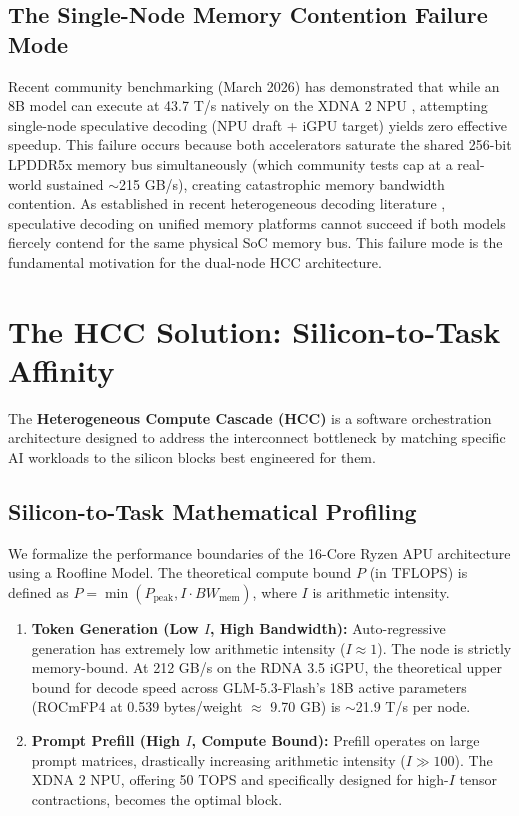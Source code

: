 \documentclass[11pt,a4paper]{article}
\begin{document}
\subsection{The Single-Node Memory Contention Failure Mode}

Recent community benchmarking (March 2026) has demonstrated that while an 8B model can execute at 43.7 T/s natively on the XDNA 2 NPU \cite{xdna_community}, attempting single-node speculative decoding (NPU draft + iGPU target) yields zero effective speedup. This failure occurs because both accelerators saturate the shared 256-bit LPDDR5x memory bus simultaneously (which community tests cap at a real-world sustained $\sim$215 GB/s), creating catastrophic memory bandwidth contention. As established in recent heterogeneous decoding literature \cite{hetero_spec}, speculative decoding on unified memory platforms cannot succeed if both models fiercely contend for the same physical SoC memory bus. This failure mode is the fundamental motivation for the dual-node HCC architecture.

\section{The HCC Solution: Silicon-to-Task Affinity}

The \textbf{Heterogeneous Compute Cascade (HCC)} is a software orchestration architecture designed to address the interconnect bottleneck by matching specific AI workloads to the silicon blocks best engineered for them.

\subsection{Silicon-to-Task Mathematical Profiling}
We formalize the performance boundaries of the 16-Core Ryzen APU architecture using a Roofline Model. The theoretical compute bound $P$ (in TFLOPS) is defined as $P = \min(P_{\text{peak}}, I \cdot BW_{\text{mem}})$, where $I$ is arithmetic intensity.

\begin{enumerate}
    \item \textbf{Token Generation (Low $I$, High Bandwidth):} Auto-regressive generation has extremely low arithmetic intensity ($I \approx 1$). The node is strictly memory-bound. At 212 GB/s on the RDNA 3.5 iGPU, the theoretical upper bound for decode speed across GLM-5.3-Flash's 18B active parameters (ROCmFP4 at 0.539 bytes/weight $\approx$ 9.70 GB) is $\sim$21.9 T/s per node.
    \item \textbf{Prompt Prefill (High $I$, Compute Bound):} Prefill operates on large prompt matrices, drastically increasing arithmetic intensity ($I \gg 100$). The XDNA 2 NPU, offering 50 TOPS and specifically designed for high-$I$ tensor contractions, becomes the optimal block.
\end{enumerate}
\end{document}
